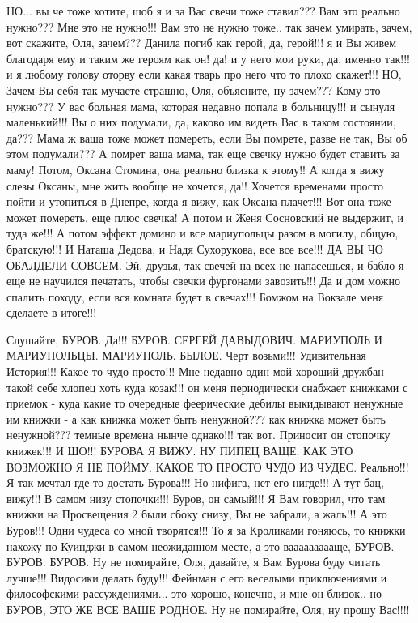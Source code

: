НО... вы че тоже хотите, шоб я и за Вас свечи тоже ставил??? Вам это реально
нужно???  Мне это не нужно!!!  Вам это не нужно тоже.. так зачем умирать,
зачем, вот скажите, Оля, зачем???  Данила погиб как герой, да, герой!!! я и Вы
живем благодаря ему и таким же героям как он! да! и у него мои руки, да, именно
так!!! и я любому голову оторву если какая тварь про него что то плохо
скажет!!! НО, Зачем Вы себя так мучаете страшно, Оля, объясните, ну зачем???
Кому это нужно??? У вас больная мама, которая недавно попала в больницу!!! и
сынуля маленький!!! Вы о них подумали, да, каково им видеть Вас в таком
состоянии, да??? Мама ж ваша тоже может помереть, если Вы помрете, разве не
так, Вы об этом подумали??? А помрет ваша мама, так еще свечку нужно будет
ставить за маму!  Потом, Оксана Стомина, она реально близка к этому!! А когда я
вижу слезы Оксаны, мне жить вообще не хочется, да!! Хочется временами просто
пойти и утопиться в Днепре, когда я вижу, как Оксана плачет!!!  Вот она тоже
может помереть, еще плюс свечка! А потом и Женя Сосновский не выдержит, и туда
же!!! А потом эффект домино и все мариупольцы разом в могилу, общую,
братскую!!! И Наташа Дедова, и Надя Сухорукова, все все все!!! ДА ВЫ ЧО
ОБАЛДЕЛИ СОВСЕМ.  Эй, друзья, так свечей на всех не напасешься, и бабло я еще
не научился печатать, чтобы свечки фургонами завозить!!!  Да и дом можно
спалить походу, если вся комната будет в свечах!!! Бомжом на Вокзале меня
сделаете в итоге!!!

Слушайте, БУРОВ. Да!!! БУРОВ. СЕРГЕЙ ДАВЫДОВИЧ. МАРИУПОЛЬ И МАРИУПОЛЬЦЫ. МАРИУПОЛЬ. БЫЛОЕ. 
Черт возьми!!! Удивительная История!!!
Какое то чудо просто!!! Мне недавно один мой хороший дружбан - такой себе хлопец хоть куда козак!!! 
он меня периодически снабжает книжками
с приемок - куда какие то очередные феерические дебилы выкидывают ненужные им книжки - 
а как книжка может быть ненужной??? как книжка может быть ненужной??? темные времена нынче однако!!!
так вот. Приносит он стопочку книжек!!! И ШО!!! БУРОВА Я ВИЖУ. НУ ПИПЕЦ ВАЩЕ. КАК ЭТО ВОЗМОЖНО
Я НЕ ПОЙМУ. КАКОЕ ТО ПРОСТО ЧУДО ИЗ ЧУДЕС. Реально!!! Я так мечтал где-то достать Бурова!!! Но нифига,
нет его нигде!!! А тут бац, вижу!!! В самом низу стопочки!!! Буров, он самый!!! Я Вам говорил, что там книжки
на Просвещения 2 были сбоку снизу, Вы не забрали, а жаль!!! А это Буров!!! Одни чудеса со мной творятся!!! То я за Кроликами 
гоняюсь, то книжки нахожу по Куинджи в самом неожиданном месте, а это ваааааааааще, БУРОВ. БУРОВ. БУРОВ.
Ну не помирайте, Оля, давайте, я Вам Бурова буду читать лучше!!! Видосики делать буду!!! Фейнман с его веселыми приключениями
и философскими рассуждениями... это хорошо, конечно, и мне он близок.. но БУРОВ, ЭТО ЖЕ ВСЕ ВАШЕ РОДНОЕ.
Ну не помирайте, Оля, ну прошу Вас!!!!


